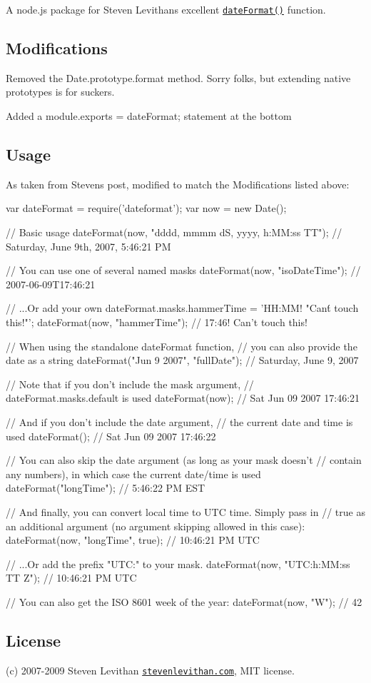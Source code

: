 A node.\+js package for Steven Levithan\textquotesingle{}s excellent \href{http://blog.stevenlevithan.com/archives/date-time-format}{\tt date\+Format()} function.

\subsection*{Modifications}


\begin{DoxyItemize}
\item Removed the {\ttfamily Date.\+prototype.\+format} method. Sorry folks, but extending native prototypes is for suckers.
\item Added a {\ttfamily module.\+exports = date\+Format;} statement at the bottom
\end{DoxyItemize}

\subsection*{Usage}

As taken from Steven\textquotesingle{}s post, modified to match the Modifications listed above\+: \begin{DoxyVerb}var dateFormat = require('dateformat');
var now = new Date();

// Basic usage
dateFormat(now, "dddd, mmmm dS, yyyy, h:MM:ss TT");
// Saturday, June 9th, 2007, 5:46:21 PM

// You can use one of several named masks
dateFormat(now, "isoDateTime");
// 2007-06-09T17:46:21

// ...Or add your own
dateFormat.masks.hammerTime = 'HH:MM! "Can\'t touch this!"';
dateFormat(now, "hammerTime");
// 17:46! Can't touch this!

// When using the standalone dateFormat function,
// you can also provide the date as a string
dateFormat("Jun 9 2007", "fullDate");
// Saturday, June 9, 2007

// Note that if you don't include the mask argument,
// dateFormat.masks.default is used
dateFormat(now);
// Sat Jun 09 2007 17:46:21

// And if you don't include the date argument,
// the current date and time is used
dateFormat();
// Sat Jun 09 2007 17:46:22

// You can also skip the date argument (as long as your mask doesn't
// contain any numbers), in which case the current date/time is used
dateFormat("longTime");
// 5:46:22 PM EST

// And finally, you can convert local time to UTC time. Simply pass in
// true as an additional argument (no argument skipping allowed in this case):
dateFormat(now, "longTime", true);
// 10:46:21 PM UTC

// ...Or add the prefix "UTC:" to your mask.
dateFormat(now, "UTC:h:MM:ss TT Z");
// 10:46:21 PM UTC

// You can also get the ISO 8601 week of the year:
dateFormat(now, "W");
// 42
\end{DoxyVerb}
 \subsection*{License}

(c) 2007-\/2009 Steven Levithan \href{http://stevenlevithan.com/}{\tt stevenlevithan.\+com}, M\+IT license. 